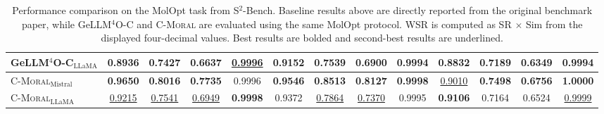 \documentclass[11pt]{article}
\begin{document}
\begin{table}[!htbp]
{\begin{tabular}{@{} l cccc cccc cccc @{}}
GeLLM$^4$O-C$_{\mathrm{LLaMA}}$
& 0.8936 & 0.7427 & 0.6637 & \underline{0.9996}
& 0.9152 & 0.7539 & 0.6900 & 0.9994
& 0.8832 & 0.7189 & 0.6349 & 0.9994 \\
\midrule
\textsc{C-Moral}$_{\mathrm{Mistral}}$
& \textbf{0.9650} & \textbf{0.8016} & \textbf{0.7735} & 0.9996
& \textbf{0.9546} & \textbf{0.8513} & \textbf{0.8127} & \textbf{0.9998}
& \underline{0.9010} & \textbf{0.7498} & \textbf{0.6756} & \textbf{1.0000} \\

\textsc{C-Moral}$_{\mathrm{LLaMA}}$
& \underline{0.9215} & \underline{0.7541} & \underline{0.6949} & \textbf{0.9998}
& 0.9372 & \underline{0.7864} & \underline{0.7370} & 0.9995
& \textbf{0.9106} & 0.7164 & 0.6524 & \underline{0.9999} \\
\bottomrule
\end{tabular}
}
\caption{Performance comparison on the MolOpt task from S$^2$-Bench. Baseline results above are directly reported from the original benchmark paper, while GeLLM$^4$O-C and \textsc{C-Moral} are evaluated using the same MolOpt protocol. WSR is computed as SR $\times$ Sim from the displayed four-decimal values. Best results are bolded and second-best results are underlined.}
\label{tab:molopt_results}
\end{table}
\end{document}
